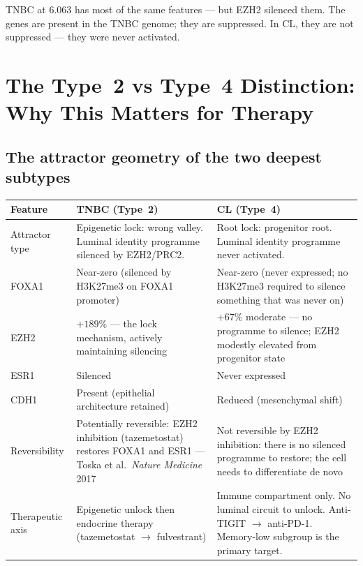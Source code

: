 \documentclass[12pt, a4paper]{article}
\begin{document}
TNBC at 6.063 has most of the same features ---
but EZH2 silenced them. The genes are present
in the TNBC genome; they are suppressed.
In CL, they are not suppressed --- they were
never activated.

\section{The Type~2 vs Type~4 Distinction:
Why This Matters for Therapy}

\subsection{The attractor geometry of the
two deepest subtypes}

\begin{center}
\begin{tabular}{p{3cm}p{5cm}p{5cm}}
\toprule
\textbf{Feature} &
\textbf{TNBC (Type~2)} &
\textbf{CL (Type~4)} \\
\midrule
Attractor type &
Epigenetic lock: wrong valley.
Luminal identity programme silenced by
EZH2/PRC2. &
Root lock: progenitor root.
Luminal identity programme never activated. \\[0.4em]
FOXA1 &
Near-zero (silenced by H3K27me3 on
FOXA1 promoter) &
Near-zero (never expressed; no
H3K27me3 required to silence
something that was never on) \\[0.4em]
EZH2 &
$+189\%$ --- the lock mechanism,
actively maintaining silencing &
$+67\%$ moderate --- no programme
to silence; EZH2 modestly elevated
from progenitor state \\[0.4em]
ESR1 &
Silenced &
Never expressed \\[0.4em]
CDH1 &
Present (epithelial architecture
retained) &
Reduced (mesenchymal shift) \\[0.4em]
Reversibility &
Potentially reversible: EZH2
inhibition (tazemetostat) restores
FOXA1 and ESR1 --- Toska et al.\
\textit{Nature Medicine} 2017 &
Not reversible by EZH2 inhibition:
there is no silenced programme to
restore; the cell needs to
differentiate de novo \\[0.4em]
Therapeutic axis &
Epigenetic unlock then endocrine
therapy (tazemetostat
$\rightarrow$ fulvestrant) &
Immune compartment only.
No luminal circuit to unlock.
Anti-TIGIT $\rightarrow$ anti-PD-1.
Memory-low subgroup is the
primary target. \\
\bottomrule
\end{tabular}
\end{center}
\end{document}
